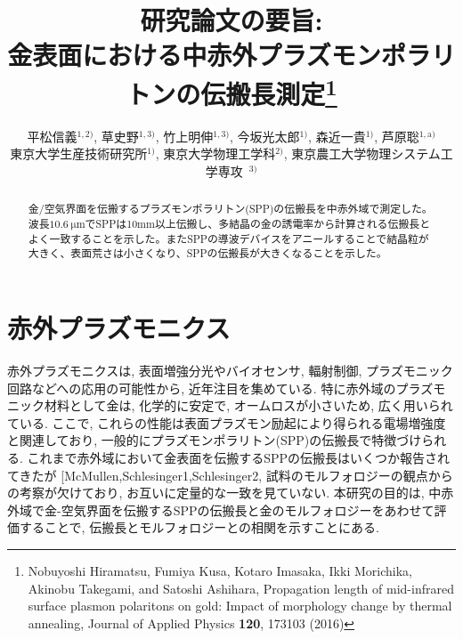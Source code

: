 \documentclass[a4,10truept]{jsarticle}
\title{研究論文の要旨: \\
金表面における中赤外プラズモンポラリトンの伝搬長測定\thanks{Nobuyoshi Hiramatsu, Fumiya Kusa, Kotaro Imasaka, Ikki Morichika, Akinobu Takegami, and Satoshi Ashihara, Propagation length of mid-infrared surface plasmon polaritons on gold: Impact of morphology change by thermal annealing, Journal of Applied Physics {\bf 120}, 173103 (2016)
} }
\author{平松信義$\!^{1,2)}$, 草史野$\!^{1,3)}$, 竹上明伸$\!^{1,3)}$, 今坂光太郎$\!^{1)}$, 森近一貴$\!^{1)}$, 芦原聡$\!^{1,\mathrm{a})}$\\ 東京大学生産技術研究所$\!^{1)}$, 東京大学物理工学科$\!^{2)}$, 東京農工大学物理システム工学専攻~$\!^{3)}$}
\date{}
\makeatletter
\DeclareRobustCommand\cite{\unskip
\@ifnextchar[{\@tempswatrue\@citex}{\@tempswafalse\@citex[]}}
\makeatother
\begin{document}
\maketitle
\thispagestyle{mypagestyle}

\begin{abstract}
{\fontsize{10pt}{0pt} 金/空気界面を伝搬するプラズモンポラリトン(SPP)の伝搬長を中赤外域で測定した。波長$10.6\:\mathrm{\mu m}$でSPPは10mm以上伝搬し、多結晶の金の誘電率から計算される伝搬長とよく一致することを示した。またSPPの導波デバイスをアニールすることで結晶粒が大きく、表面荒さは小さくなり、SPPの伝搬長が大きくなることを示した。}
\end{abstract}

\section{赤外プラズモニクス}
\vspace{-0.5em}
\mc 赤外プラズモニクスは,  表面増強分光やバイオセンサ, 輻射制御, プラズモニック回路などへの応用の可能性から, 近年注目を集めている. 特に赤外域のプラズモニック材料として金は, 化学的に安定で, オームロスが小さいため, 広く用いられている. 
ここで, これらの性能は表面プラズモン励起により得られる電場増強度と関連しており, 一般的にプラズモンポラリトン(SPP)の伝搬長で特徴づけられる. 
これまで赤外域において金表面を伝搬するSPPの伝搬長はいくつか報告されてきたが\cite{McMullen,Schlesinger1,Schlesinger2}, 試料のモルフォロジーの観点からの考察が欠けており, お互いに定量的な一致を見ていない. 本研究の目的は, 中赤外域で金-空気界面を伝搬するSPPの伝搬長と金のモルフォロジーをあわせて評価することで, 伝搬長とモルフォロジーとの相関を示すことにある. 

\vspace{-0.2em}
\end{document}
